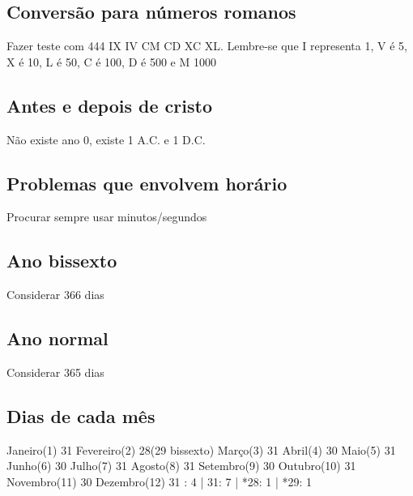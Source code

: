 \documentclass[a4paper,12pt]{article}
\begin{document}
\subsection{Conversão para números romanos}
\noindent Fazer teste com 444 IX IV CM CD XC XL. Lembre-se que I representa 1, V é 5, X é 10, L é 50, C é 100, D é 500 e M 1000

\subsection{Antes e depois de cristo}
\noindent Não existe ano 0, existe 1 A.C. e 1 D.C.

\subsection{Problemas que envolvem horário}
\noindent Procurar sempre usar minutos/segundos

\subsection{Ano bissexto}
\noindent Considerar 366 dias

\subsection{Ano normal}
\noindent Considerar 365 dias

\subsection{Dias de cada mês}
\noindent Janeiro(1) 31
\newline\noindent Fevereiro(2) 28(29 bissexto)
\newline\noindent Março(3) 31
\newline\noindent Abril(4) 30
\newline\noindent Maio(5) 31
\newline\noindent Junho(6) 30
\newline\noindent Julho(7) 31
\newline\noindent Agosto(8) 31
\newline\noindent Setembro(9) 30
\newline\noindent Outubro(10) 31
\newline\noindent Novembro(11) 30
\newline\noindent Dezembro(12) 31
\newline{}: 4 | 31: 7 | *28: 1 | *29: 1
\end{document}
